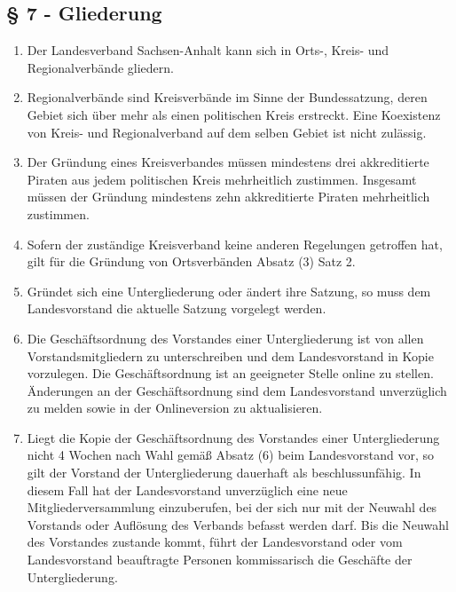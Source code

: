 \subsection{§ 7 - Gliederung}
\begin{enumerate}
\item Der Landesverband Sachsen-Anhalt kann sich in Orts-, Kreis- und
Regionalverbände gliedern.

\item Regionalverbände sind Kreisverbände im Sinne der Bundessatzung, deren
Gebiet sich über mehr als einen politischen Kreis erstreckt. Eine Koexistenz von
Kreis- und Regionalverband auf dem selben Gebiet ist nicht zulässig.

\item Der Gründung eines Kreisverbandes müssen mindestens drei akkreditierte
Piraten aus jedem politischen Kreis mehrheitlich zustimmen. Insgesamt müssen der
Gründung mindestens zehn akkreditierte Piraten mehrheitlich zustimmen.

\item Sofern der zuständige Kreisverband keine anderen Regelungen getroffen hat,
gilt für die Gründung von Ortsverbänden Absatz (3) Satz 2.

\item Gründet sich eine Untergliederung oder ändert ihre Satzung, so muss dem
Landesvorstand die aktuelle Satzung vorgelegt werden.

\item Die Geschäftsordnung des Vorstandes einer Untergliederung ist von allen
Vorstandsmitgliedern zu unterschreiben und dem Landesvorstand in Kopie
vorzulegen. Die Geschäftsordnung ist an geeigneter Stelle online zu stellen.
Änderungen an der Geschäftsordnung sind dem Landesvorstand unverzüglich zu
melden sowie in der Onlineversion zu aktualisieren.

\item Liegt die Kopie der Geschäftsordnung des Vorstandes einer Untergliederung
nicht 4 Wochen nach Wahl gemäß Absatz (6) beim Landesvorstand vor, so gilt der
Vorstand der Untergliederung dauerhaft als beschlussunfähig. In diesem Fall hat
der Landesvorstand unverzüglich eine neue Mitgliederversammlung einzuberufen,
bei der sich nur mit der Neuwahl des Vorstands oder Auflösung des Verbands
befasst werden darf. Bis die Neuwahl des Vorstandes zustande kommt, führt der
Landesvorstand oder vom Landesvorstand beauftragte Personen kommissarisch die
Geschäfte der Untergliederung.
\end{enumerate}


